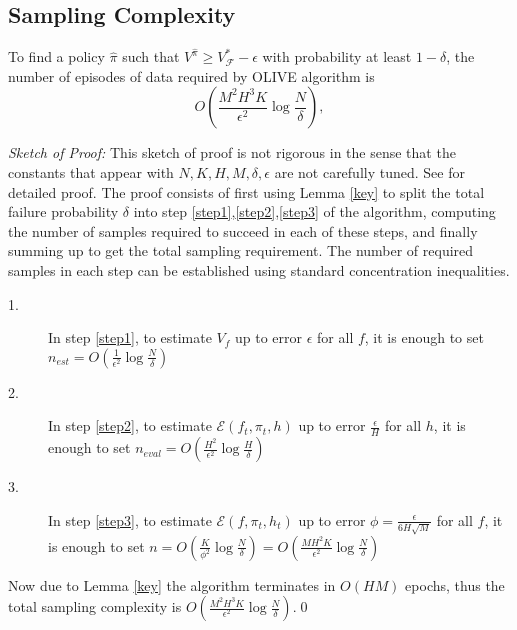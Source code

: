 \documentclass[11pt]{article}
\begin{document}
\subsection{Sampling Complexity}
\begin{theorem}
To find a policy $\hat{\pi}$ such that $V^{\hat{\pi}}\geq V^*_{\mathcal F}-\epsilon$ with probability at least $1-\delta$, the number of episodes of data required by OLIVE algorithm is
\begin{equation*}
O\left(\frac{M^2H^3K}{\epsilon^2}\log \frac{N}{\delta}\right),
\end{equation*}
\end{theorem}
\textit{Sketch of Proof: }This sketch of proof is not rigorous in the sense that the constants that appear with $N,K,H,M,\delta,\epsilon$ are not carefully tuned.  See \cite{jiang2016contextual} for detailed proof. The proof consists of first using Lemma \ref{key} to split the total failure probability $\delta$ into step \ref{step1},\ref{step2},\ref{step3} of the algorithm, computing the number of samples required to succeed in each of these steps, and finally summing up to get the total sampling requirement. The number of required samples in each step can be established using standard concentration inequalities.
\begin{description}
\item[1.]In step \ref{step1}, to estimate $V_f$ up to error $\epsilon$ for all $f$, it is enough to set $n_{est}=O\left(\frac{1}{\epsilon^2}\log \frac{N}{\delta}\right)$
\item[2.]In step \ref{step2}, to estimate $\mathcal{E}(f_t,\pi_t,h)$ up to error $\frac{\epsilon}{H}$ for all $h$, it is enough to set $n_{eval}=O\left(\frac{H^2}{\epsilon^2}\log \frac{H}{\delta}\right)$
\item[3.]In step \ref{step3}, to estimate $\mathcal{E}(f,\pi_t,h_t)$ up to error $\phi=\frac{\epsilon}{6H\sqrt{M}}$ for all $f$, it is enough to set $n=O\left(\frac{K}{\phi^2}\log \frac{N}{\delta}\right)=O\left(\frac{MH^2K}{\epsilon^2}\log \frac{N}{\delta}\right)$
\end{description}
Now due to Lemma \ref{key} the algorithm terminates in $O\left(HM\right)$ epochs, thus the total sampling complexity is $O\left(\frac{M^2H^3K}{\epsilon^2}\log \frac{N}{\delta}\right)$.\qed







\end{document}
